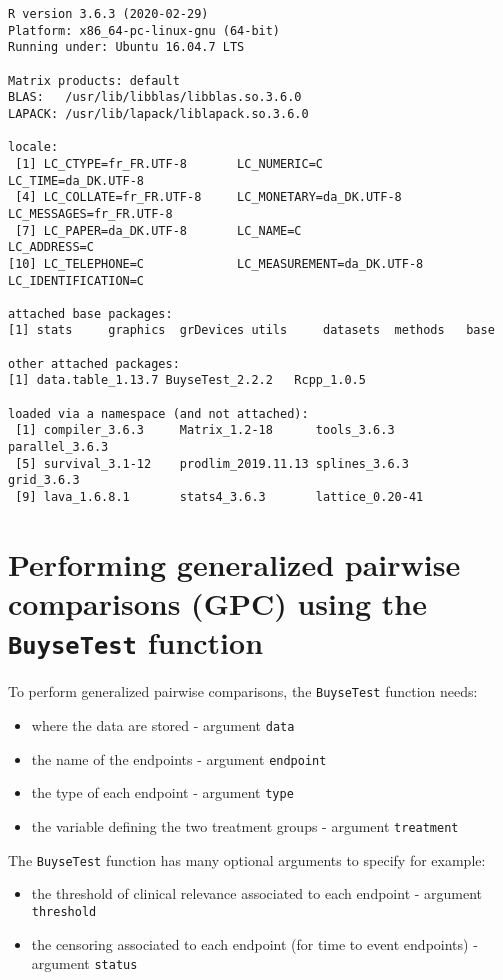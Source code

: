 \documentclass[12pt]{article}
\begin{document}
\begin{verbatim}
R version 3.6.3 (2020-02-29)
Platform: x86_64-pc-linux-gnu (64-bit)
Running under: Ubuntu 16.04.7 LTS

Matrix products: default
BLAS:   /usr/lib/libblas/libblas.so.3.6.0
LAPACK: /usr/lib/lapack/liblapack.so.3.6.0

locale:
 [1] LC_CTYPE=fr_FR.UTF-8       LC_NUMERIC=C               LC_TIME=da_DK.UTF-8       
 [4] LC_COLLATE=fr_FR.UTF-8     LC_MONETARY=da_DK.UTF-8    LC_MESSAGES=fr_FR.UTF-8   
 [7] LC_PAPER=da_DK.UTF-8       LC_NAME=C                  LC_ADDRESS=C              
[10] LC_TELEPHONE=C             LC_MEASUREMENT=da_DK.UTF-8 LC_IDENTIFICATION=C       

attached base packages:
[1] stats     graphics  grDevices utils     datasets  methods   base     

other attached packages:
[1] data.table_1.13.7 BuyseTest_2.2.2   Rcpp_1.0.5       

loaded via a namespace (and not attached):
 [1] compiler_3.6.3     Matrix_1.2-18      tools_3.6.3        parallel_3.6.3    
 [5] survival_3.1-12    prodlim_2019.11.13 splines_3.6.3      grid_3.6.3        
 [9] lava_1.6.8.1       stats4_3.6.3       lattice_0.20-41
\end{verbatim}

\clearpage

\section{Performing generalized pairwise comparisons (GPC) using the \texttt{BuyseTest} function}
\label{sec:org7bbf3dc}

To perform generalized pairwise comparisons, the \texttt{BuyseTest} function needs:
\begin{itemize}
\item where the data are stored \hfill - argument \texttt{data}
\item the name of the endpoints \hfill - argument \texttt{endpoint}
\item the type of each endpoint \hfill - argument \texttt{type}
\item the variable defining the two treatment groups \hfill - argument
\texttt{treatment}
\end{itemize}
The \texttt{BuyseTest} function has many optional arguments to specify for example:
\begin{itemize}
\item the threshold of clinical relevance associated to each endpoint \hfill - argument \texttt{threshold}
\item the censoring associated to each endpoint (for time to event endpoints) \hfill - argument \texttt{status}
\end{itemize}
\end{document}
